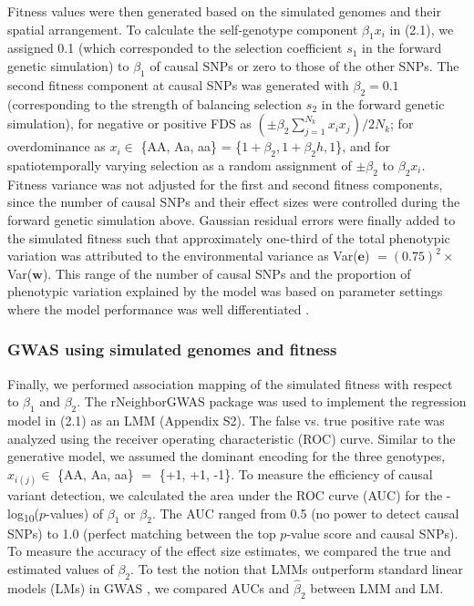 \documentclass[12pt,]{article}
\begin{document}
Fitness values were then generated based on the simulated genomes and their spatial arrangement. To calculate the self-genotype component $\beta_1x_i$ in (2.1), we assigned 0.1 (which corresponded to the selection coefficient $s_1$ in the forward genetic simulation) to $\beta_1$ of causal SNPs or zero to those of the other SNPs. The second fitness component at causal SNPs was generated with $\beta_2 = 0.1$ (corresponding to the strength of balancing selection $s_2$ in the forward genetic simulation), for negative or positive FDS as $(\pm \beta_2\sum^{N_{k}}_{j=1}{x_ix_j}) / 2N_k$; for overdominance as $x_i \in$ \{AA, Aa, aa\} = \{$1+\beta_2, 1+\beta_2h, 1$\}, and for spatiotemporally varying selection as a random assignment of $\pm \beta_2$ to $\beta_2x_i$. Fitness variance was not adjusted for the first and second fitness components, since the number of causal SNPs and their effect sizes were controlled during the forward genetic simulation above. Gaussian residual errors were finally added to the simulated fitness such that approximately one-third of the total phenotypic variation was attributed to the environmental variance as Var($\mathbf{e}$) $=(0.75)^2 \times$Var($\mathbf{w}$). This range of the number of causal SNPs and the proportion of phenotypic variation explained by the model was based on parameter settings where the model performance was well differentiated \citep{sato2019neighbor}.

\subsubsection{GWAS using simulated genomes and fitness}
Finally, we performed association mapping of the simulated fitness with respect to $\beta_1$ and $\beta_2$. The rNeighborGWAS package \citep{sato2019neighbor} was used to implement the regression model in (2.1) as an LMM (Appendix S2). The false vs. true positive rate was analyzed using the receiver operating characteristic (ROC) curve. Similar to the generative model, we assumed the dominant encoding for the three genotypes, $x_{i(j)} \in$ \{AA, Aa, aa\} $=$ \{+1, +1, -1\}. To measure the efficiency of causal variant detection, we calculated the area under the ROC curve (AUC) for the -log\textsubscript{10}($p$-values) of $\beta_1$ or $\beta_2$. The AUC ranged from 0.5 (no power to detect causal SNPs) to 1.0 (perfect matching between the top $p$-value score and causal SNPs). To measure the accuracy of the effect size estimates, we compared the true and estimated values of $\beta_2$. To test the notion that LMMs outperform standard linear models (LMs) in GWAS \citep{kang2008efficient}, we compared AUCs and $\hat{\beta}_2$ between LMM and LM.
\end{document}
